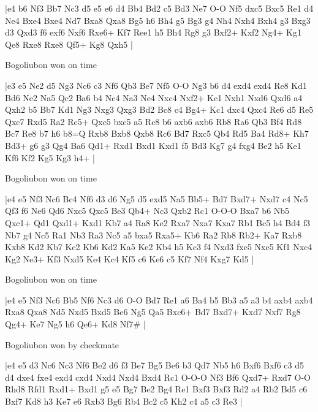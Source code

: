 \makegametitle
|e4 b6 Nf3 Bb7 Nc3 d5 e5 e6 d4 Bb4 Bd2 c5 Bd3 Ne7 O-O Nf5 dxc5 Bxc5 Re1 d4 Ne4 Bxe4 Bxe4 Nd7 Bxa8 Qxa8 Bg5 h6 Bh4 g5 Bg3 g4 Nh4 Nxh4 Bxh4 g3 Bxg3 d3 Qxd3 f6 exf6 Nxf6 Rxe6+ Kf7 Ree1 h5 Bh4 Rg8 g3 Bxf2+ Kxf2 Ng4+ Kg1 Qe8 Rxe8 Rxe8 Qf5+ Kg8 Qxh5  |

\showboard

Bogoliubon won on time

\makegametitle
|e3 e5 Ne2 d5 Ng3 Nc6 c3 Nf6 Qb3 Be7 Nf5 O-O Ng3 b6 d4 exd4 exd4 Re8 Kd1 Bd6 Ne2 Na5 Qc2 Ba6 b4 Nc4 Na3 Ne4 Nxc4 Nxf2+ Ke1 Nxh1 Nxd6 Qxd6 a4 Qxh2 b5 Bb7 Kd1 Ng3 Nxg3 Qxg3 Bd2 Bc8 c4 Bg4+ Kc1 dxc4 Qxc4 Re6 d5 Re5 Qxc7 Rxd5 Ra2 Rc5+ Qxc5 bxc5 a5 Rc8 b6 axb6 axb6 Rb8 Ra6 Qb3 Bf4 Rd8 Bc7 Re8 b7 h6 b8=Q Rxb8 Bxb8 Qxb8 Rc6 Bd7 Rxc5 Qb4 Rd5 Ba4 Rd8+ Kh7 Bd3+ g6 g3 Qg4 Ba6 Qd1+ Rxd1 Bxd1 Kxd1 f5 Bd3 Kg7 g4 fxg4 Be2 h5 Ke1 Kf6 Kf2 Kg5 Kg3 h4+  |

\showboard

Bogoliubon won on time

\makegametitle
|e4 e5 Nf3 Nc6 Bc4 Nf6 d3 d6 Ng5 d5 exd5 Na5 Bb5+ Bd7 Bxd7+ Nxd7 c4 Nc5 Qf3 f6 Ne6 Qd6 Nxc5 Qxc5 Be3 Qb4+ Nc3 Qxb2 Rc1 O-O-O Bxa7 b6 Nb5 Qxc1+ Qd1 Qxd1+ Kxd1 Kb7 a4 Ra8 Ke2 Rxa7 Nxa7 Kxa7 Rb1 Bc5 h4 Bd4 f3 Nb7 g4 Nc5 Ra1 Nb3 Ra3 Nc5 a5 bxa5 Rxa5+ Kb6 Ra2 Rb8 Rb2+ Ka7 Rxb8 Kxb8 Kd2 Kb7 Kc2 Kb6 Kd2 Ka5 Ke2 Kb4 h5 Kc3 f4 Nxd3 fxe5 Nxe5 Kf1 Nxc4 Kg2 Ne3+ Kf3 Nxd5 Ke4 Kc4 Kf5 c6 Ke6 c5 Kf7 Nf4 Kxg7 Kd5  |

\showboard

Bogoliubon won on time

\makegametitle
|e4 e5 Nf3 Nc6 Bb5 Nf6 Nc3 d6 O-O Bd7 Re1 a6 Ba4 b5 Bb3 a5 a3 b4 axb4 axb4 Rxa8 Qxa8 Nd5 Nxd5 Bxd5 Be6 Ng5 Qa5 Bxc6+ Bd7 Bxd7+ Kxd7 Nxf7 Rg8 Qg4+ Ke7 Ng5 h6 Qe6+ Kd8 Nf7\#  |

\showboard

Bogoliubon won by checkmate

\makegametitle
|e4 e5 d3 Nc6 Nc3 Nf6 Be2 d6 f3 Be7 Bg5 Be6 b3 Qd7 Nb5 h6 Bxf6 Bxf6 c3 d5 d4 dxe4 fxe4 exd4 cxd4 Nxd4 Nxd4 Bxd4 Rc1 O-O-O Nf3 Bf6 Qxd7+ Rxd7 O-O Rhd8 Rfd1 Rxd1+ Bxd1 g5 e5 Bg7 Be2 Bg4 Re1 Bxf3 Bxf3 Rd2 a4 Rb2 Bd5 c6 Bxf7 Kd8 h3 Ke7 e6 Rxb3 Bg6 Rb4 Bc2 c5 Kh2 c4 a5 c3 Re3  |

